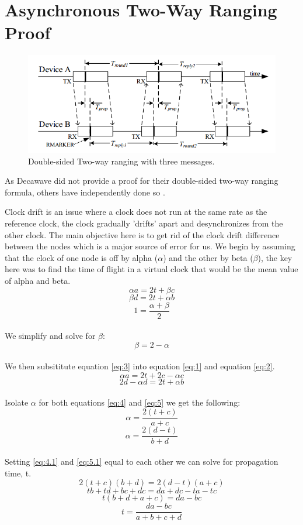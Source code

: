 
\chapter{Asynchronous Two-Way Ranging Proof} %

\label{AsyncProof} %

\begin{figure}
	\centering
	\includegraphics[width=\linewidth]{Figures/AsyncRanging.png}
	\decoRule
	\caption{Double-sided Two-way ranging with three messages\cite{DW1000UserManual}.}
	\label{fig:AsyncRangingAppendix}
\end{figure}

As Decawave did not provide a proof for their double-sided two-way ranging formula, others have independently done so \cite{AsyncProofPost}.

Clock drift is an issue where a clock does not run at the same rate as the reference clock, the clock gradually 'drifts' apart and desynchronizes from the other clock. The main objective here is to get rid of the clock drift difference between the nodes which is a major source of error for us.
We begin by assuming that the clock of one node is off by alpha ($\alpha$) and the other by beta ($\beta$), the key here was to find the time of flight in a virtual clock that would be the mean value of alpha and beta.
\\
\[ \alpha a = 2t + \beta c  \tag{1} \label{eq:1} \]
\[ \beta d = 2t + \alpha b  \tag{2} \label{eq:2} \]
\[ 1 = \frac{\alpha + \beta}{2} \]
\\
We simplify and solve for $\beta$:
\\
\[ \beta = 2 - \alpha  \tag{3} \label{eq:3} \]
\\
We then subsititute equation \eqref{eq:3} into equation \eqref{eq:1} and equation \eqref{eq:2}.
\\
\[ \alpha a = 2t + 2c - \alpha c  \tag{4} \label{eq:4} \]
\[ 2d - \alpha d = 2t + \alpha b  \tag{5} \label{eq:5} \]
\\
Isolate $\alpha$ for both equations \eqref{eq:4} and \eqref{eq:5} we get the following:
\\
\[ \alpha = \frac{2(t + c)}{a + c}  \tag{4.1} \label{eq:4.1} \]
\[ \alpha = \frac{2(d - t)}{b + d}  \tag{5.1} \label{eq:5.1} \]
\\
Setting \eqref{eq:4.1} and \eqref{eq:5.1} equal to each other we can solve for propagation time, t.
\\
\[ 2(t + c)(b +d) = 2(d - t)(a + c)\]
\[ tb + td +bc + dc = da + dc - ta - tc \]
\[ t(b + d + a + c) = da - bc\]
\[ t = \frac{da-bc}{a + b + c + d}  \tag{6} \label{eq:6} \]
\\
